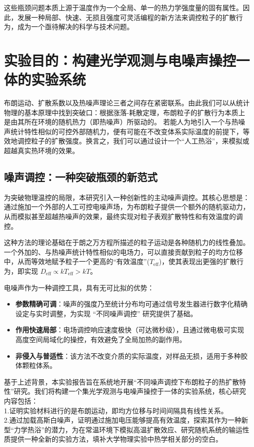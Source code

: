 \documentclass[a4paper]{report} %
\begin{document}
这些瓶颈问题本质上源于温度作为一个全局、单一的热力学强度量的固有属性。因此，发展一种局部、快速、无损且强度可灵活编程的新方法来调控粒子的扩散行为，成为一个亟待解决的科学与技术问题。

\section{实验目的：构建光学观测与电噪声操控一体的实验系统}
布朗运动、扩散系数以及热噪声理论三者之间存在紧密联系。由此我们可以从统计物理的基本原理中找到突破口：根据涨落-耗散定理，布朗粒子的扩散行为本质上是由其所在环境的随机热力（即热噪声）所驱动的。
若能人为地引入一个与热噪声统计特性相似的可控外部随机力，便有可能在不改变体系实际温度的前提下，等效地调控粒子的扩散强度。换言之，我们可以通过设计一个“人工热浴”，来模拟或超越真实热环境的效果。
\subsection{噪声调控：一种突破瓶颈的新范式}
为突破物理温控的局限，本研究引入一种创新性的主动噪声调控。其核心思想是：通过施加一个外部的人工可控电噪声场，为布朗粒子提供一个额外的随机驱动力，从而模拟甚至超越热噪声的效果，最终实现对粒子表观扩散特性和有效温度的调控。

这种方法的理论基础在于朗之万方程所描述的粒子运动是各种随机力的线性叠加。一个外加的、与热噪声统计特性相似的电场力，可以直接贡献到粒子的均方位移中，从而等效地赋予粒子一个更高的“有效温度”($T_{\mathrm{eff}}$)，使其表现出更强的扩散行为，即实现 $D_{\mathrm{eff}} \propto kT_{\mathrm{eff}} > kT$。

电噪声作为一种调控工具，具有无可比拟的优势：
\begin{itemize}
  \item \textbf{参数精确可调}：噪声的强度乃至统计分布均可通过信号发生器进行数字化精确设定与实时调整，为实现 “不同噪声调控” 研究提供了基础。
  \item \textbf{作用快速局部}：电场调控响应速度极快（可达微秒级），且通过微电极可实现高度空间局域化的操控，有效避免了全局加热的副作用。
  \item \textbf{非侵入与普适性}：该方法不改变介质的实际温度，对样品无损，适用于多种胶体颗粒体系。
\end{itemize}
基于上述背景，本实验报告旨在系统地开展“不同噪声调控下布朗粒子的热扩散特性”研究。我们将构建一个集光学观测与电噪声操控于一体的实验系统，核心研究内容包括：\\
1.证明实验材料进行的是布朗运动，即均方位移与时间间隔具有线性关系。\\
2.通过加载高斯白噪声，证明通过施加电压能够提高有效温度，探索其作为一种新型“力学热浴”的潜力，为在常温环境下模拟高温扩散效应、研究随机系统的输运性质提供一种全新的实验方法，填补大学物理实验中热学相关部分的空白。
\end{document}
